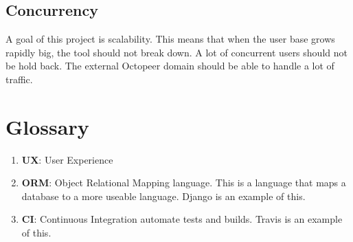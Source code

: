 \documentclass{article}
\begin{document}
\subsection{Concurrency}

A goal of this project is scalability. This means that when the user base grows rapidly big, the tool should not break down. A lot of concurrent users should not be hold back. The external Octopeer domain should be able to handle a lot of traffic.

\section{Glossary}

\begin{enumerate}
    \item \textbf{UX}: User Experience
    \item \textbf{ORM}: Object Relational Mapping language. This is a language that maps a database to a more useable language. Django is an example of this.
    \item \textbf{CI}: Continuous Integration automate tests and builds. Travis is an example of this.
\end{enumerate}
\end{document}

